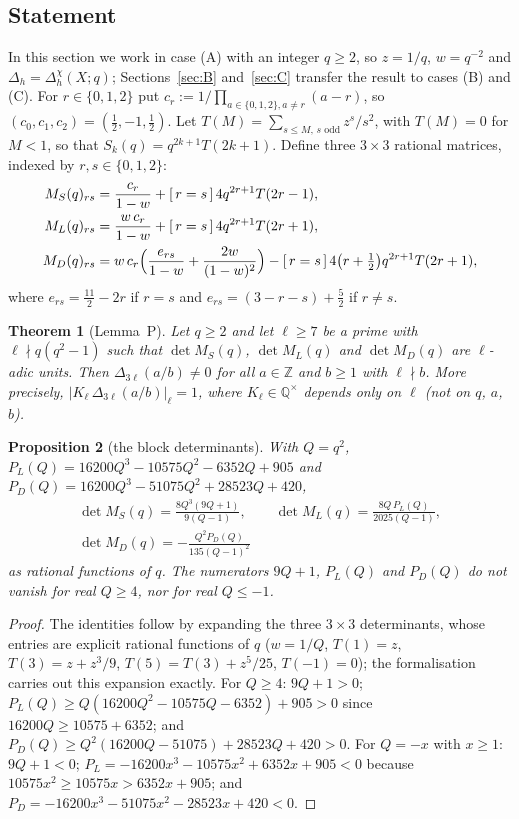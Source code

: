 \documentclass[11pt]{amsart}
\newtheorem{theorem}{Theorem}[section]
\newtheorem{proposition}[theorem]{Proposition}
\theoremstyle{definition}
\theoremstyle{remark}
\numberwithin{equation}{section}
\newcommand{\ZZ}{\mathbb{Z}}
\newcommand{\QQ}{\mathbb{Q}}
\newcommand{\ind}[1]{[\,#1\,]}
\begin{document}
\subsection{Statement}
In this section we work in case (A) with an integer $q\ge2$, so $z=1/q$, $w=q^{-2}$ and $\Delta_h=\Delta^\chi_h(X;q)$;
Sections~\ref{sec:B} and~\ref{sec:C} transfer the result to cases (B) and (C). For $r\in\{0,1,2\}$ put $c_r:=1/\prod_{a\in\{0,1,2\},a\ne r}(a-r)$, so $(c_0,c_1,c_2)=(\frac12,-1,\frac12)$. Let
$T(M)=\sum_{s\le M,\,s\text{ odd}}z^s/s^2$, with $T(M)=0$ for $M<1$, so that $S_k(q)=q^{2k+1}T(2k+1)$. Define three $3\times3$ rational matrices, indexed by $r,s\in\{0,1,2\}$:
\begin{align*}
  M_S(q)_{rs}&=\frac{c_r}{1-w}+\ind{r=s}\,4q^{2r+1}T(2r-1),\\
  M_L(q)_{rs}&=\frac{w\,c_r}{1-w}+\ind{r=s}\,4q^{2r+1}T(2r+1),\\
  M_D(q)_{rs}&=w\,c_r\Bigl(\frac{e_{rs}}{1-w}+\frac{2w}{(1-w)^2}\Bigr)-\ind{r=s}\,4\bigl(r+\tfrac12\bigr)q^{2r+1}T(2r+1),
\end{align*}
where $e_{rs}=\frac{11}2-2r$ if $r=s$ and $e_{rs}=(3-r-s)+\frac52$ if $r\ne s$.

\begin{theorem}[Lemma~P]\label{thm:lemmaP}
Let $q\ge2$ and let $\ell\ge7$ be a prime with $\ell\nmid q(q^2-1)$ such that $\det M_S(q)$, $\det M_L(q)$ and
$\det M_D(q)$ are $\ell$-adic units. Then $\Delta_{3\ell}(a/b)\ne0$ for all $a\in\ZZ$ and $b\ge1$ with $\ell\nmid b$.
More precisely, $|K_\ell\,\Delta_{3\ell}(a/b)|_\ell=1$, where $K_\ell\in\QQ^\times$ depends only on $\ell$ (not on $q$, $a$,
$b$).
\end{theorem}

\begin{proposition}[the block determinants]\label{prop:blocks}
With $Q=q^2$, $P_L(Q)=16200Q^3-10575Q^2-6352Q+905$ and $P_D(Q)=16200Q^3-51075Q^2+28523Q+420$,
\begin{gather*}
  \det M_S(q)=\frac{8Q^3(9Q+1)}{9(Q-1)},\qquad \det M_L(q)=\frac{8Q\,P_L(Q)}{2025(Q-1)},\\
  \det M_D(q)=-\frac{Q^2P_D(Q)}{135(Q-1)^2}
\end{gather*}
as rational functions of $q$. The numerators $9Q+1$, $P_L(Q)$ and $P_D(Q)$ do not vanish for real $Q\ge4$, nor for
real $Q\le-1$.
\end{proposition}

\begin{proof}
The identities follow by expanding the three $3\times3$ determinants, whose entries are explicit rational functions of
$q$ ($w=1/Q$, $T(1)=z$, $T(3)=z+z^3/9$, $T(5)=T(3)+z^5/25$, $T(-1)=0$); the formalisation carries out this expansion
exactly. For $Q\ge4$: $9Q+1>0$; $P_L(Q)\ge Q(16200Q^2-10575Q-6352)+905>0$ since $16200Q\ge10575+6352$; and
$P_D(Q)\ge Q^2(16200Q-51075)+28523Q+420>0$. For $Q=-x$ with $x\ge1$: $9Q+1<0$;
$P_L=-16200x^3-10575x^2+6352x+905<0$ because $10575x^2\ge10575x>6352x+905$; and
$P_D=-16200x^3-51075x^2-28523x+420<0$.
\end{proof}
\end{document}
